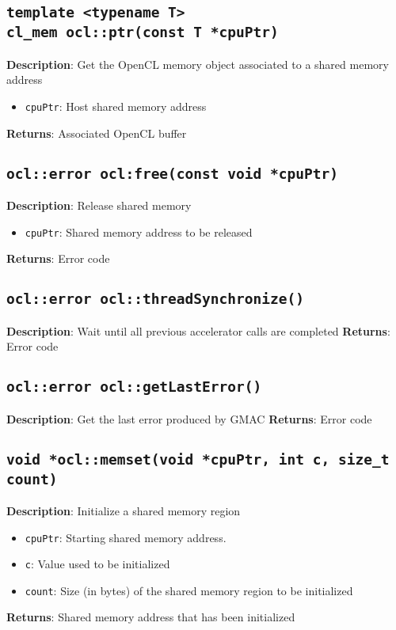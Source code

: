 \subsection{\texttt{template <typename T>\\cl\_mem ocl::ptr(const T *cpuPtr)}}

\textbf{Description}: Get the OpenCL memory object associated to a shared memory address
\begin{itemize}
  \item \texttt{cpuPtr}: Host shared memory address
\end{itemize}
\textbf{Returns}: Associated OpenCL buffer

\subsection{\texttt{ocl::error ocl:free(const void *cpuPtr)}}

\textbf{Description}: Release shared memory
\begin{itemize}
  \item \texttt{cpuPtr}: Shared memory address to be released
\end{itemize}
\textbf{Returns}: Error code

\subsection{\texttt{ocl::error ocl::threadSynchronize()}}

\textbf{Description}: Wait until all previous accelerator calls are completed
\textbf{Returns}: Error code

\subsection{\texttt{ocl::error ocl::getLastError()}}

\textbf{Description}: Get the last error produced by GMAC
\textbf{Returns}: Error code

\subsection{\texttt{void *ocl::memset(void *cpuPtr, int c, size\_t count)}}

\textbf{Description}: Initialize a shared memory region
\begin{itemize}
  \item \texttt{cpuPtr}: Starting shared memory address.
  \item \texttt{c}: Value used to be initialized
  \item \texttt{count}: Size (in bytes) of the shared memory region to be initialized
\end{itemize}
\textbf{Returns}: Shared memory address that has been initialized

